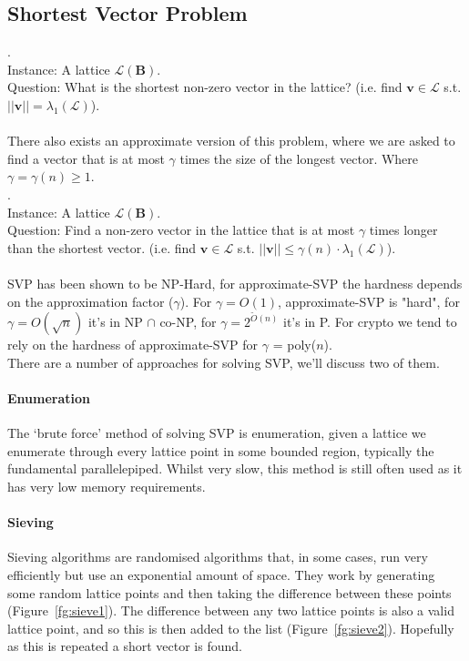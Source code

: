 \subsection{Shortest Vector Problem} 
.
\\
Instance: A lattice $\mathcal{L}(\textbf{B})$.
\\
Question: What is the shortest non-zero vector in the lattice? (i.e. find $\textbf{v} \in \mathcal{L}$ s.t. $||\textbf{v}|| = \lambda_1(\mathcal{L})$).
\\
~\\
There also exists an approximate version of this problem, where we are asked to find a vector that is at most $\gamma$ times the size of the longest vector. Where $\gamma = \gamma(n) \geq 1$.
\\
.
\\
Instance: A lattice $\mathcal{L}(\textbf{B})$.
\\
Question: Find a non-zero vector in the lattice that is at most $\gamma$ times longer than the shortest vector. (i.e. find $\textbf{v} \in \mathcal{L}$ s.t. $||\textbf{v}|| \leq \gamma(n)\cdot\lambda_1(\mathcal{L})$).
\\
~\\
SVP has been shown to be NP-Hard, for approximate-SVP the hardness depends on the approximation factor ($\gamma$). For $\gamma = O(1)$, approximate-SVP is "hard", for $\gamma = O(\sqrt{n})$ it's in NP $\cap$ co-NP, for $\gamma = 2^{\tilde{O}(n)}$ it's in P. For crypto we tend to rely on the hardness of approximate-SVP for $\gamma$ = poly($n$).
\\
There are a number of approaches for solving SVP, we'll discuss two of them.
\paragraph{Enumeration} The `brute force' method of solving SVP is enumeration, given a lattice we enumerate through every lattice point in some bounded region, typically the fundamental parallelepiped. Whilst very slow, this method is still often used as it has very low memory requirements.
\paragraph{Sieving} Sieving algorithms are randomised algorithms that, in some cases, run very efficiently but use an exponential amount of space. They work by generating some random lattice points and then taking the difference between these points (Figure~\ref{fg:sieve1}). The difference between any two lattice points is also a valid lattice point, and so this is then added to the list (Figure~\ref{fg:sieve2}). Hopefully as this is repeated a short vector is found.

